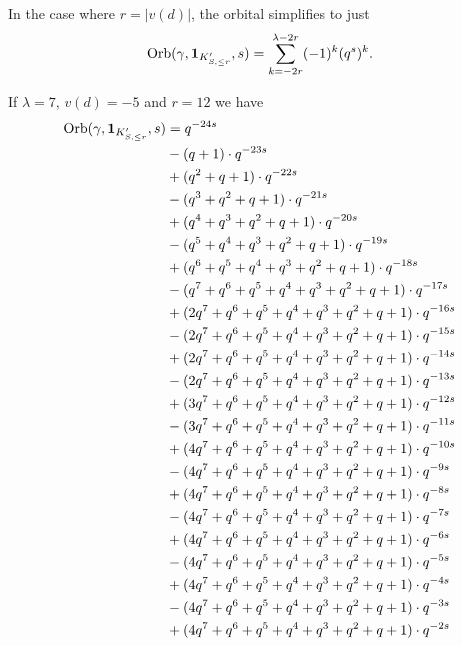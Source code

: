 \begin{example}
  \label{ex:ell_neg_top_case}
  In the case where $r = |v(d)|$, the orbital simplifies to just
  \[ \operatorname{Orb}(\gamma, \mathbf{1}_{K'_{S, \le r}}, s)
    = \sum_{k=-2r}^{\lambda-2r} (-1)^k (q^s)^k. \]
\end{example}

\begin{example}
  If $\lambda = 7$, $v(d) = -5$ and $r = 12$ we have
  \begin{align*}
    \Orb(\gamma, \mathbf{1}_{K'_{S, \le r}}, s)
    &= q^{-24s} \\
    &- (q+1) \cdot q^{-23s} \\
    &+ (q^2+q+1) \cdot q^{-22s} \\
    &- (q^3+q^2+q+1) \cdot q^{-21s} \\
    &+ (q^4+q^3+q^2+q+1) \cdot q^{-20s} \\
    &- (q^5+q^4+q^3+q^2+q+1) \cdot q^{-19s} \\
    &+ (q^6+q^5+q^4+q^3+q^2+q+1) \cdot q^{-18s} \\
    &- (q^7+q^6+q^5+q^4+q^3+q^2+q+1) \cdot q^{-17s} \\
    &+ (2q^7+q^6+q^5+q^4+q^3+q^2+q+1) \cdot q^{-16s} \\
    &- (2q^7+q^6+q^5+q^4+q^3+q^2+q+1) \cdot q^{-15s} \\
    &+ (2q^7+q^6+q^5+q^4+q^3+q^2+q+1) \cdot q^{-14s} \\
    &- (2q^7+q^6+q^5+q^4+q^3+q^2+q+1) \cdot q^{-13s} \\
    &+ (3q^7+q^6+q^5+q^4+q^3+q^2+q+1) \cdot q^{-12s} \\
    &- (3q^7+q^6+q^5+q^4+q^3+q^2+q+1) \cdot q^{-11s} \\
    &+ (4q^7+q^6+q^5+q^4+q^3+q^2+q+1) \cdot q^{-10s} \\
    &- (4q^7+q^6+q^5+q^4+q^3+q^2+q+1) \cdot q^{-9s} \\
    &+ (4q^7+q^6+q^5+q^4+q^3+q^2+q+1) \cdot q^{-8s} \\
    &- (4q^7+q^6+q^5+q^4+q^3+q^2+q+1) \cdot q^{-7s} \\
    &+ (4q^7+q^6+q^5+q^4+q^3+q^2+q+1) \cdot q^{-6s} \\
    &- (4q^7+q^6+q^5+q^4+q^3+q^2+q+1) \cdot q^{-5s} \\
    &+ (4q^7+q^6+q^5+q^4+q^3+q^2+q+1) \cdot q^{-4s} \\
    &- (4q^7+q^6+q^5+q^4+q^3+q^2+q+1) \cdot q^{-3s} \\
    &+ (4q^7+q^6+q^5+q^4+q^3+q^2+q+1) \cdot q^{-2s} \\

\end{align*}
\end{example}
